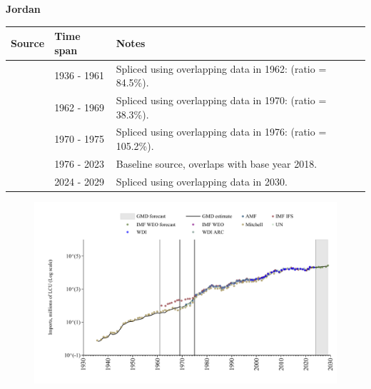 \documentclass[12pt,a4paper,landscape]{article}
\begin{document}
\begin{adjustbox}{max totalsize={\paperwidth}{\paperheight},center}
\begin{minipage}[t][\textheight][t]{\textwidth}
\vspace*{0.5cm}
{}
\begin{center}
{\Large\bfseries Jordan}
\end{center}
\vspace{0.5cm}
\begin{table}[H]
\centering
\small
\begin{tabular}{|l|l|l|}
\hline
\textbf{Source} & \textbf{Time span} & \textbf{Notes} \\
\hline
\rowcolor{white}\cite{Mitchell}& 1936 - 1961 &Spliced using overlapping data in 1962: (ratio = 84.5\%).\\
\rowcolor{lightgray}\cite{IMF_IFS}& 1962 - 1969 &Spliced using overlapping data in 1970: (ratio = 38.3\%).\\
\rowcolor{white}\cite{UN}& 1970 - 1975 &Spliced using overlapping data in 1976: (ratio = 105.2\%).\\
\rowcolor{lightgray}\cite{WDI}& 1976 - 2023 &Baseline source, overlaps with base year 2018.\\
\rowcolor{white}\cite{IMF_WEO_forecast}& 2024 - 2029 &Spliced using overlapping data in 2030.\\
\hline
\end{tabular}
\end{table}
\begin{figure}[H]
\centering
\includegraphics[width=\textwidth,height=0.6\textheight,keepaspectratio]{graphs/JOR_imports.pdf}
\end{figure}
\end{minipage}
\end{adjustbox}
\end{document}
